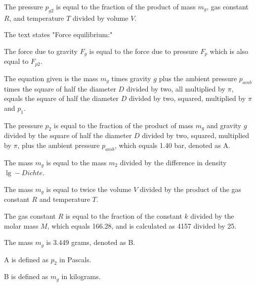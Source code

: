 The pressure \( p_{g2} \) is equal to the fraction of the product of mass \( m_g \), gas constant \( R \), and temperature \( T \) divided by volume \( V \).

The text states "Force equilibrium:"

The force due to gravity \( F_g \) is equal to the force due to pressure \( F_p \) which is also equal to \( F_{p2} \).

The equation given is the mass \( m_g \) times gravity \( g \) plus the ambient pressure \( p_{amb} \) times the square of half the diameter \( D \) divided by two, all multiplied by \( \pi \), equals the square of half the diameter \( D \) divided by two, squared, multiplied by \( \pi \) and \( p_1 \).

The pressure \( p_2 \) is equal to the fraction of the product of mass \( m_g \) and gravity \( g \) divided by the square of half the diameter \( D \) divided by two, squared, multiplied by \( \pi \), plus the ambient pressure \( p_{amb} \), which equals 1.40 bar, denoted as A.

The mass \( m_g \) is equal to the mass \( m_2 \) divided by the difference in density \( \lg - Dichte \).

The mass \( m_g \) is equal to twice the volume \( V \) divided by the product of the gas constant \( R \) and temperature \( T \).

The gas constant \( R \) is equal to the fraction of the constant \( k \) divided by the molar mass \( M \), which equals 166.28, and is calculated as 4157 divided by 25.

The mass \( m_g \) is 3.449 grams, denoted as B.

A is defined as \( p_2 \) in Pascals.

B is defined as \( m_g \) in kilograms.